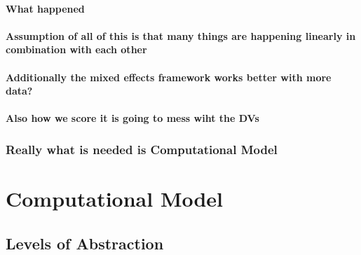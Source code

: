 \documentclass[]{book}
\begin{document}
\hypertarget{what-happened}{%
\subsubsection{What happened}\label{what-happened}}

\hypertarget{assumption-of-all-of-this-is-that-many-things-are-happening-linearly-in-combination-with-each-other}{%
\subsubsection{Assumption of all of this is that many things are happening linearly in combination with each other}\label{assumption-of-all-of-this-is-that-many-things-are-happening-linearly-in-combination-with-each-other}}

\hypertarget{additionally-the-mixed-effects-framework-works-better-with-more-data}{%
\subsubsection{Additionally the mixed effects framework works better with more data?}\label{additionally-the-mixed-effects-framework-works-better-with-more-data}}

\hypertarget{also-how-we-score-it-is-going-to-mess-wiht-the-dvs}{%
\subsubsection{Also how we score it is going to mess wiht the DVs}\label{also-how-we-score-it-is-going-to-mess-wiht-the-dvs}}

\hypertarget{really-what-is-needed-is-computational-model}{%
\subsection{Really what is needed is Computational Model}\label{really-what-is-needed-is-computational-model}}

\hypertarget{computational-model}{%
\chapter{Computational Model}\label{computational-model}}

\hypertarget{levels-of-abstraction}{%
\section{Levels of Abstraction}\label{levels-of-abstraction}}
\end{document}
